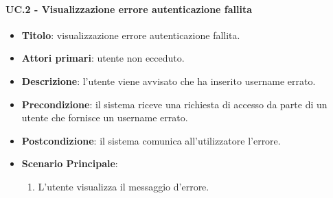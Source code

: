 	\paragraph{UC\theuccount.2 - Visualizzazione errore autenticazione fallita}
		\begin{itemize}
			\item \textbf{Titolo}: visualizzazione errore autenticazione fallita.
			\item \textbf{Attori primari}: utente non ecceduto.
			\item \textbf{Descrizione}: l'utente viene avvisato che ha inserito username errato.
			\item \textbf{Precondizione}: il sistema riceve una richiesta di accesso da parte di un utente che
			fornisce un username errato. 
			\item \textbf{Postcondizione}: il sistema comunica all'utilizzatore l'errore.
			\item \textbf{Scenario Principale}:
			\begin{enumerate}
				\item L'utente visualizza il messaggio d'errore.
			\end{enumerate}
		\end{itemize}



